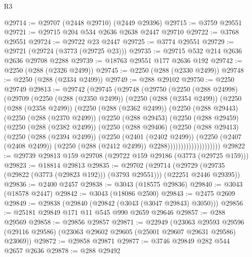 \begin{lexlean}{R3}
\begin{coremodule}
@29714 := @29707 (@2448 @29710) (@2449 @29396)
@29715 := @3759 @29551
@29721 := @29715 @204 @534 @2636 @2638 @2447 @29710
@29722 := @3768 @29551
@29724 := @29722 @23 @2447
@29725 := @3774 @29551
@29729 := @29721 (@29724 (@3773 (@29725 @23)))
@29735 := @29715 @532 @214 @2636 @2636 @29708 @2288
@29739 := @18763 @29551 @177 @2636 @192
@29742 := @2250 (@288 (@2326 @2499))
@29745 := @2250 (@288 (@2330 @2499))
@29748 := @2250 (@288 (@2334 @2499))
@29749 := @288 @29102
@29750 := @2250 @29749
@29813 := @29742
    (@29745
      (@29748
        (@29750
          (@2250
            (@288 @24998)
            (@29709
              (@2250
                (@288 (@2350 @2499))
                (@2250
                  (@288 (@2354 @2499))
                  (@2250
                    (@288 (@2358 @2499))
                    (@2250
                      (@288 (@2362 @2499))
                      (@2250
                        (@288 @29443)
                        (@2250
                          (@288 (@2370 @2499))
                          (@2250
                            (@288 @29453)
                            (@2250
                              (@288 @29459)
                              (@2250
                                (@288 (@2382 @2499))
                                (@2250
                                  (@288 @29406)
                                  (@2250
                                    (@288 @29413)
                                    (@2250
                                      (@288 (@2394 @2499))
                                      (@2250
                                        (@2401 (@2402 @2499))
                                        (@2250
                                          (@2407 (@2408 @2499))
                                          (@2250 (@288 (@2412 @2499)) @2288))))))))))))))))))))
@29822 := @29739 @29813 @159 @29708 (@29722 @159 @29186 (@3773 (@29725 @159)))
@29823 := @18814 @29813
@29835 := @29702
    (@29714 (@29729 (@29735 (@29822 (@3773 (@29823 @192))) (@3793 @29551))) (@22251 @2446 @29395))
@29836 := @2400 @2457
@29838 := @3043 (@18575 @29836)
@29840 := @3043 (@18578 @2447)
@29842 := @3043 (@18086 @2500)
@29843 := @2475 @2609
@29849 := @29838 (@29840 (@29842 (@3043 (@3047 @29843) @3050)))
@29856 := @25181 @29849 @171 @11 @545 @990 @2659 @29646
@29857 := @288 @29569
@29858 := @29856 @29857
@29871 := @22949
    (@23063
      @29593
      @29596
      (@29116 @29586)
      (@23063 @29602 @29605 (@25001 @29607 @29631 @29586) @23069))
@29872 := @29858 @29871
@29877 := @3746 @29849 @282 @544 @2657 @2636
@29878 := @288 @29492

\end{coremodule}
\end{lexlean}
